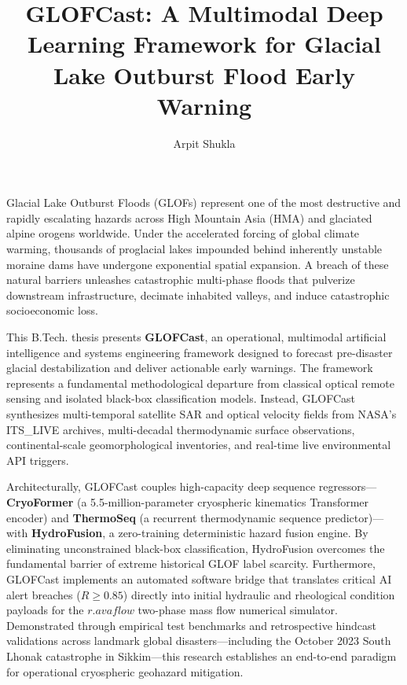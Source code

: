 \documentclass{mnnit}
\begin{document}
\title{GLOFCast: A Multimodal Deep Learning Framework for Glacial Lake Outburst Flood Early Warning}
\author{Arpit Shukla}


\beforepreface

Glacial Lake Outburst Floods (GLOFs) represent one of the most destructive and rapidly escalating hazards across High Mountain Asia (HMA) and glaciated alpine orogens worldwide. Under the accelerated forcing of global climate warming, thousands of proglacial lakes impounded behind inherently unstable moraine dams have undergone exponential spatial expansion. A breach of these natural barriers unleashes catastrophic multi-phase floods that pulverize downstream infrastructure, decimate inhabited valleys, and induce catastrophic socioeconomic loss.

This B.Tech. thesis presents \textbf{GLOFCast}, an operational, multimodal artificial intelligence and systems engineering framework designed to forecast pre-disaster glacial destabilization and deliver actionable early warnings. The framework represents a fundamental methodological departure from classical optical remote sensing and isolated black-box classification models. Instead, GLOFCast synthesizes multi-temporal satellite SAR and optical velocity fields from NASA's ITS\_LIVE archives, multi-decadal thermodynamic surface observations, continental-scale geomorphological inventories, and real-time live environmental API triggers.

Architecturally, GLOFCast couples high-capacity deep sequence regressors---\textbf{CryoFormer} (a 5.5-million-parameter cryospheric kinematics Transformer encoder) and \textbf{ThermoSeq} (a recurrent thermodynamic sequence predictor)---with \textbf{HydroFusion}, a zero-training deterministic hazard fusion engine. By eliminating unconstrained black-box classification, HydroFusion overcomes the fundamental barrier of extreme historical GLOF label scarcity. Furthermore, GLOFCast implements an automated software bridge that translates critical AI alert breaches ($R \ge 0.85$) directly into initial hydraulic and rheological condition payloads for the $r.avaflow$ two-phase mass flow numerical simulator. Demonstrated through empirical test benchmarks and retrospective hindcast validations across landmark global disasters---including the October 2023 South Lhonak catastrophe in Sikkim---this research establishes an end-to-end paradigm for operational cryospheric geohazard mitigation.
\end{document}
